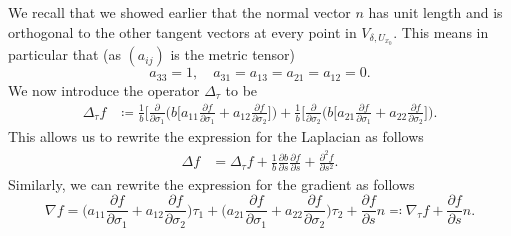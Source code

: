 \documentclass[12pt,a4paper]{article}
\theoremstyle{definition}
\theoremstyle{remark}
\numberwithin{equation}{section}
\begin{document}
We recall that we showed earlier that the normal vector $n$ has unit length and is orthogonal to the other tangent vectors at every point in $V_{\delta, U_{x_0}}$. This means in particular that (as $(a_{ij})$ is the metric tensor)
\begin{equation} \label{metricsimplification}
a_{33} = 1, \quad a_{31} = a_{13} = a_{21} = a_{12} = 0.
\end{equation}
We now introduce the operator $\Delta_\tau$ to be 
\begin{align}  \label{tangentiallaplacian}
\Delta_\tau f &\coloneqq \frac{1}{b} \bigg[ \frac{\partial}{\partial \sigma_1} \bigg( b \bigg[  a_{11} \frac{\partial f}{\partial \sigma_1} + a_{12} \frac{\partial f}{\partial \sigma_2} \bigg] \bigg) + \frac{1}{b} \bigg[ \frac{\partial}{\partial \sigma_2} \bigg( b \bigg[  a_{21} \frac{\partial f}{\partial \sigma_1} +  a_{22} \frac{\partial f}{\partial \sigma_2} \bigg] \bigg).
\end{align}
This allows us to rewrite the expression for the Laplacian as follows
\begin{align} \label{laplaciancoord}
\Delta f &= \Delta_\tau f + \frac{1}{b} \frac{\partial b}{\partial s} \frac{\partial f}{\partial s}   + \frac{\partial^2 f}{\partial s^2}.
\end{align}
Similarly, we can rewrite the expression for the gradient as follows
\begin{equation} \label{gradcoord}
\nabla f = \bigg( a_{11} \frac{\partial f}{\partial \sigma_1} + a_{12} \frac{\partial f}{\partial \sigma_2} \bigg) \tau_1 + \bigg( a_{21} \frac{\partial f}{\partial \sigma_1} + a_{22} \frac{\partial f}{\partial \sigma_2} \bigg) \tau_2 + \frac{\partial f}{\partial s} n \eqqcolon \nabla_\tau f + \frac{\partial f}{\partial s} n.
\end{equation}
\end{document}
